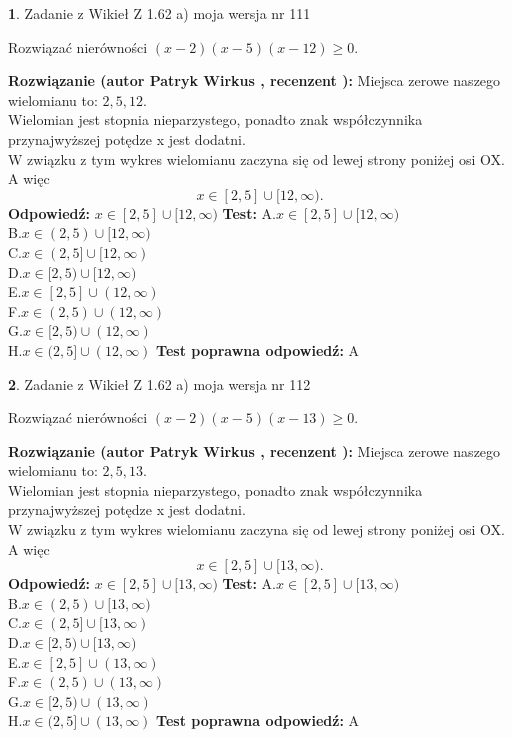 \documentclass[12pt, a4paper]{article}
\theoremstyle{definition} %
\newtheorem{zad}{}
\newcommand{\zadStart}[1]{\begin{zad}#1\newline}
\newcommand{\zadStop}{\end{zad}}
\newcommand{\rozwStart}[2]{\noindent \textbf{Rozwiązanie (autor #1 , recenzent #2): }\newline}
\newcommand{\rozwStop}{\newline}
\newcommand{\odpStart}{\noindent \textbf{Odpowiedź:}\newline}
\newcommand{\odpStop}{\newline}
\newcommand{\testStart}{\noindent \textbf{Test:}\newline}
\newcommand{\testStop}{\newline}
\newcommand{\kluczStart}{\noindent \textbf{Test poprawna odpowiedź:}\newline}
\newcommand{\kluczStop}{\newline}
\begin{document}
\zadStart{Zadanie z Wikieł Z 1.62 a) moja wersja nr 111}

Rozwiązać nierówności $(x-2)(x-5)(x-12)\ge0$.
\zadStop
\rozwStart{Patryk Wirkus}{}
Miejsca zerowe naszego wielomianu to: $2, 5, 12$.\\
Wielomian jest stopnia nieparzystego, ponadto znak współczynnika przy\linebreak najwyższej potędze x jest dodatni.\\ W związku z tym wykres wielomianu zaczyna się od lewej strony poniżej osi OX. A więc $$x \in [2,5] \cup [12,\infty).$$
\rozwStop
\odpStart
$x \in [2,5] \cup [12,\infty)$
\odpStop
\testStart
A.$x \in [2,5] \cup [12,\infty)$\\
B.$x \in (2,5) \cup [12,\infty)$\\
C.$x \in (2,5] \cup [12,\infty)$\\
D.$x \in [2,5) \cup [12,\infty)$\\
E.$x \in [2,5] \cup (12,\infty)$\\
F.$x \in (2,5) \cup (12,\infty)$\\
G.$x \in [2,5) \cup (12,\infty)$\\
H.$x \in (2,5] \cup (12,\infty)$
\testStop
\kluczStart
A
\kluczStop



\zadStart{Zadanie z Wikieł Z 1.62 a) moja wersja nr 112}

Rozwiązać nierówności $(x-2)(x-5)(x-13)\ge0$.
\zadStop
\rozwStart{Patryk Wirkus}{}
Miejsca zerowe naszego wielomianu to: $2, 5, 13$.\\
Wielomian jest stopnia nieparzystego, ponadto znak współczynnika przy\linebreak najwyższej potędze x jest dodatni.\\ W związku z tym wykres wielomianu zaczyna się od lewej strony poniżej osi OX. A więc $$x \in [2,5] \cup [13,\infty).$$
\rozwStop
\odpStart
$x \in [2,5] \cup [13,\infty)$
\odpStop
\testStart
A.$x \in [2,5] \cup [13,\infty)$\\
B.$x \in (2,5) \cup [13,\infty)$\\
C.$x \in (2,5] \cup [13,\infty)$\\
D.$x \in [2,5) \cup [13,\infty)$\\
E.$x \in [2,5] \cup (13,\infty)$\\
F.$x \in (2,5) \cup (13,\infty)$\\
G.$x \in [2,5) \cup (13,\infty)$\\
H.$x \in (2,5] \cup (13,\infty)$
\testStop
\kluczStart
A
\kluczStop
\end{document}
